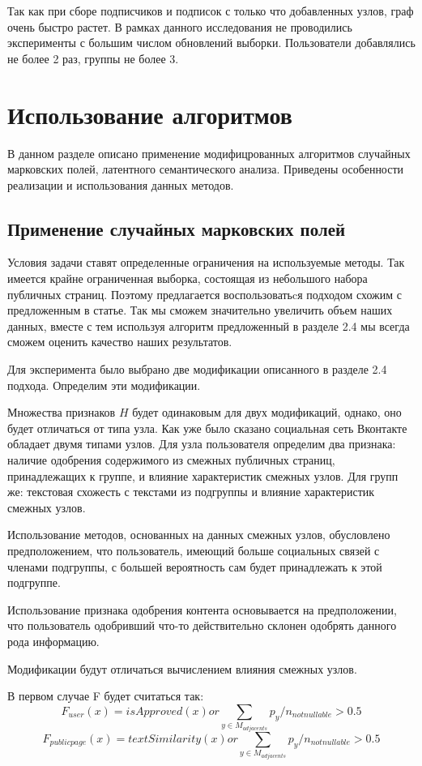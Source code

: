 \documentclass[annotation,times,page4]{itmo-student-thesis}
\begin{document}
Так как при сборе подписчиков и подписок с только что добавленных узлов, граф очень быстро растет. В рамках данного исследования не проводились эксперименты с большим числом обновлений выборки. Пользователи добавлялись не более 2 раз, группы не более 3.

\section{Использование алгоритмов}
В данном разделе описано применение модифицрованных алгоритмов случайных марковских полей, латентного семантического анализа. Приведены особенности реализации и использования данных методов.
\subsection{Применение случайных марковских полей}
Условия задачи ставят определенные ограничения на используемые методы. Так имеется крайне ограниченная выборка, состоящая из небольшого набора публичных страниц. Поэтому предлагается воспользоватьcя подходом схожим с предложенным в статье. Так мы сможем значительно увеличить объем наших данных, вместе с тем используя алгоритм предложенный в разделе 2.4 мы всегда сможем оценить качество наших результатов.

Для эксперимента было выбрано две модификации описанного в разделе 2.4 подхода. 
Определим эти модификации.

Множества признаков $H$ будет одинаковым для двух модификаций, однако, оно будет отличаться от типа узла. Как уже было сказано социальная сеть Вконтакте обладает двумя типами узлов. Для узла пользователя определим два признака: наличие одобрения содержимого из смежных публичных страниц, принадлежащих к группе, и влияние характеристик смежных узлов. Для групп же: текстовая схожесть с текстами из подгруппы и влияние характеристик смежных узлов.

Использование методов, основанных на данных смежных узлов, обусловлено предположением, что пользователь, имеющий больше социальных связей с членами подгруппы, с большей вероятность сам будет принадлежать к этой подгруппе.

Использование признака одобрения контента основывается на предположении, что пользователь одобривший что-то действительно склонен одобрять данного рода информацию.


Модификации будут отличаться вычислением влияния смежных узлов.

В первом случае F будет считаться так:
\[
    F_{user}(x) = isApproved(x) or \sum_{y \in M_{adjacents}}p_{y}/n_{notnullable} > 0.5 
\]
\[
    F_{publicpage}(x) = textSimilarity(x) or \sum_{y \in M_{adjacents}}p_{y}/n_{notnullable} > 0.5 
\]
\end{document}
